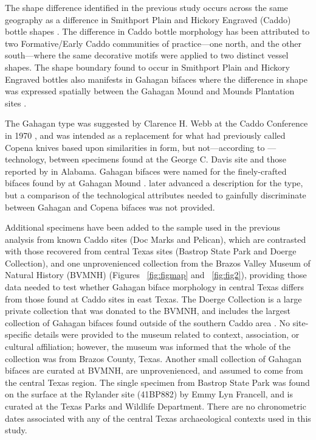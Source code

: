 \documentclass[review]{elsarticle}
\begin{document}
The shape difference identified in the previous study occurs across the same geography as a difference in Smithport Plain and Hickory Engraved (Caddo) bottle shapes \citep{RN11801,RN11782,RN11716,RN20852}. The difference in Caddo bottle morphology has been attributed to two Formative/Early Caddo communities of practice---one north, and the other south---where the same decorative motifs were applied to two distinct vessel shapes. The shape boundary found to occur in Smithport Plain and Hickory Engraved bottles \citep[Figure 1]{RN20852} also manifests in Gahagan bifaces where the difference in shape was expressed spatially between the Gahagan Mound and Mounds Plantation sites \citep{RN11783}. 

The Gahagan type was suggested by Clarence H. Webb at the Caddo Conference in 1970 \citep{RN3684}, and was intended as a replacement for what \cite{RN800} had previously called Copena knives based upon similarities in form, but not---according to \cite{RN3684}---technology, between specimens found at the George C. Davis site and those reported by \cite{RN11562} in Alabama. Gahagan bifaces were named for the finely-crafted bifaces found by \cite{RN2740} at Gahagan Mound \citep{RN3684}. \citet[22]{RN4924} later advanced a description for the type, but a comparison of the technological attributes needed to gainfully discriminate between Gahagan and Copena bifaces was not provided. 

Additional specimens have been added to the sample used in the previous analysis from known Caddo sites (Doc Marks and Pelican), which are contrasted with those recovered from central Texas sites (Bastrop State Park and Doerge Collection), and one unprovenienced collection from the Brazos Valley Museum of Natural History (BVMNH) (Figures ~\ref{fig:figmap} and ~\ref{fig:fig2}), providing those data needed to test whether Gahagan biface morphology in central Texas differs from those found at Caddo sites in east Texas. The Doerge Collection is a large private collection that was donated to the BVMNH, and includes the largest collection of Gahagan bifaces found outside of the southern Caddo area \citep[Table 5]{RN4924}. No site-specific details were provided to the museum related to context, association, or cultural affiliation; however, the museum was informed that the whole of the collection was from Brazos County, Texas. Another small collection of Gahagan bifaces are curated at BVMNH, are unprovenienced, and assumed to come from the central Texas region. The single specimen from Bastrop State Park was found on the surface at the Rylander site (41BP882) by Emmy Lyn Francell, and is curated at the Texas Parks and Wildlife Department. There are no chronometric dates associated with any of the central Texas archaeological contexts used in this study.
\end{document}
